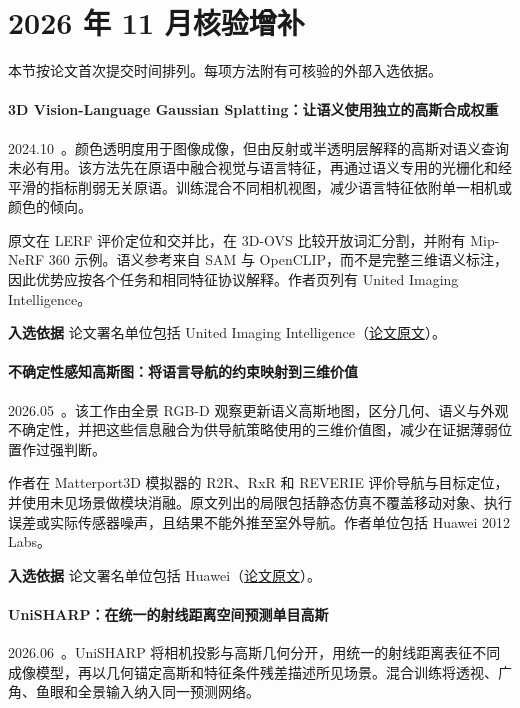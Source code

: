 \section{2026 年 11 月核验增补}

本节按论文首次提交时间排列。每项方法附有可核验的外部入选依据。

\paragraph{3D Vision-Language Gaussian Splatting：让语义使用独立的高斯合成权重}
2024.10~\cite{2410_07577}。颜色透明度用于图像成像，但由反射或半透明层解释的高斯对语义查询未必有用。该方法先在原语中融合视觉与语言特征，再通过语义专用的光栅化和经平滑的指标削弱无关原语。训练混合不同相机视图，减少语言特征依附单一相机或颜色的倾向。

原文在 LERF 评价定位和交并比，在 3D-OVS 比较开放词汇分割，并附有 Mip-NeRF 360 示例。语义参考来自 SAM 与 OpenCLIP，而不是完整三维语义标注，因此优势应按各个任务和相同特征协议解释。作者页列有 United Imaging Intelligence。

\textbf{入选依据} 论文署名单位包括 United Imaging Intelligence（\href{https://arxiv.org/html/2410.07577}{论文原文}）。

\paragraph{不确定性感知高斯图：将语言导航的约束映射到三维价值}
2026.05~\cite{2605_26503}。该工作由全景 RGB-D 观察更新语义高斯地图，区分几何、语义与外观不确定性，并把这些信息融合为供导航策略使用的三维价值图，减少在证据薄弱位置作过强判断。

作者在 Matterport3D 模拟器的 R2R、RxR 和 REVERIE 评价导航与目标定位，并使用未见场景做模块消融。原文列出的局限包括静态仿真不覆盖移动对象、执行误差或实际传感器噪声，且结果不能外推至室外导航。作者单位包括 Huawei 2012 Labs。

\textbf{入选依据} 论文署名单位包括 Huawei（\href{https://arxiv.org/html/2605.26503v1}{论文原文}）。

\paragraph{UniSHARP：在统一的射线距离空间预测单目高斯}
2026.06~\cite{2606_07514}。UniSHARP 将相机投影与高斯几何分开，用统一的射线距离表征不同成像模型，再以几何锚定高斯和特征条件残差描述所见场景。混合训练将透视、广角、鱼眼和全景输入纳入同一预测网络。

